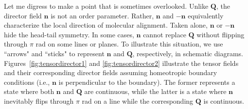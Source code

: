 \documentclass[nottitlepage]{article}
\begin{document}
Let me digress to make a point that is sometimes overlooked. Unlike $\mathbf{Q}$, the director field $\mathbf{n}$ is not an order parameter. Rather, $\mathbf{n}$ and $-\mathbf{n}$ equivalently characterize the local direction of molecular alignment. Taken alone, $\mathbf{n}$ or $-\mathbf{n}$ hide the head-tail symmetry. In some cases, $\mathbf{n}$ cannot replace $\mathbf{Q}$ without flipping through $\pi$ rad on some lines or planes.
To illustrate this situation, we use ``arrows" and ``sticks" to represent $\mathbf{n}$ and $\mathbf{Q}$, respectively, in schematic diagrams. 
Figures~\ref{fig:tensordirector1} and \ref{fig:tensordirector2} illustrate the tensor fields and their corresponding director fields assuming homeotropic boundary conditions (i.e., $\mathbf{n}$ is perpendicular to the boundary). The former represents a state where both $\mathbf{n}$ and $\mathbf{Q}$ are continuous, while the latter is a state where $\mathbf{n}$ inevitably flips through $\pi$ rad on a line %
while the corresponding $\mathbf{Q}$ is continuous. %
\end{document}

